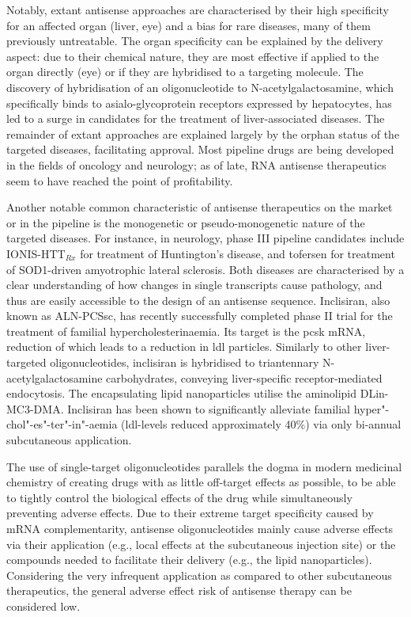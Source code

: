 Notably, extant antisense approaches are characterised by their high specificity for an affected organ (liver, eye) and a bias for rare diseases, many of them previously untreatable. The organ specificity can be explained by the delivery aspect: due to their chemical nature, they are most effective if applied to the organ directly (eye) or if they are hybridised to a targeting molecule. The discovery of hybridisation of an oligonucleotide to N-acetylgalactosamine, which specifically binds to asialo-glycoprotein receptors expressed by hepatocytes, has led to a surge in candidates for the treatment of liver-associated diseases.\cite{Wang2020} The remainder of extant approaches are explained largely by the orphan status of the targeted diseases, facilitating approval. Most pipeline drugs are being developed in the fields of oncology and neurology; as of late, RNA antisense therapeutics seem to have reached the point of profitability.\cite{Wang2020} 

Another notable common characteristic of antisense therapeutics on the market or in the pipeline is the monogenetic or pseudo-monogenetic nature of the targeted diseases. For instance, in neurology, phase III pipeline candidates include IONIS-HTT$_{Rx}$ for treatment of Huntington's disease, and tofersen for treatment of SOD1-driven amyotrophic lateral sclerosis. Both diseases are characterised by a clear understanding of how changes in single transcripts cause pathology, and thus are easily accessible to the design of an antisense sequence. Inclisiran, also known as ALN-PCSsc, has recently successfully completed phase II trial for the treatment of familial hypercholesterinaemia.\cite{Raal2020} Its target is the \ac{pcsk} mRNA, reduction of which leads to a reduction in \ac{ldl} particles. Similarly to other liver-targeted oligonucleotides, inclisiran is hybridised to  triantennary N-acetylgalactosamine carbohydrates, conveying liver-specific receptor-mediated endocytosis. The encapsulating lipid nanoparticles utilise the aminolipid DLin-MC3-DMA.\cite{Jayaraman2012} Inclisiran has been shown to significantly alleviate familial hyper"-chol"-es"-ter"-in"-aemia (\ac{ldl}-levels reduced approximately 40\%) via only bi-annual subcutaneous application.\cite{Frank-Kamenetsky2008,Fitzgerald2014,Fitzgerald2017,Raal2020}

The use of single-target oligonucleotides parallels the dogma in modern medicinal chemistry of creating drugs with as little off-target effects as possible, to be able to tightly control the biological effects of the drug while simultaneously preventing adverse effects. Due to their extreme target specificity caused by mRNA complementarity, antisense oligonucleotides mainly cause adverse effects via their application (e.g., local effects at the subcutaneous injection site) or the compounds needed to facilitate their delivery (e.g., the lipid nanoparticles). Considering the very infrequent application as compared to other subcutaneous therapeutics, the general adverse effect risk of antisense therapy can be considered low.\cite{Raal2020}

